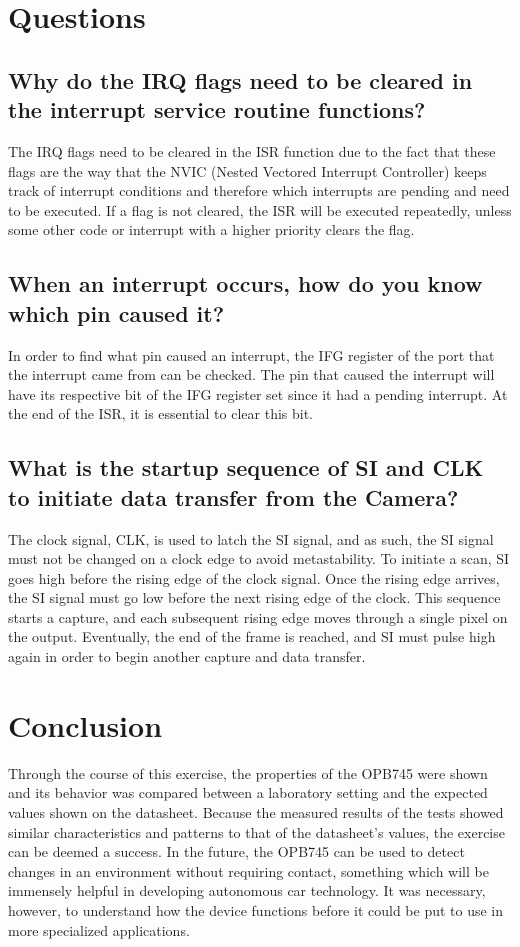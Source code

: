 \documentclass[conference]{IEEEtran}
\begin{document}
\section{Questions}

\subsection{Why do the IRQ flags need to be cleared in the interrupt service
routine functions?}

The IRQ flags need to be cleared in the ISR function due to the fact that
these flags are the way that the NVIC (Nested Vectored Interrupt Controller)
keeps track of interrupt conditions and therefore which interrupts are pending and need to be executed. If
a flag is not cleared, the ISR will be executed repeatedly, unless some other
code or interrupt with a higher priority clears the flag.

\subsection{When an interrupt occurs, how do you know which pin caused it?}

In order to find what pin caused an interrupt, the IFG register of the port
that the interrupt came from can be checked. The pin that caused the
interrupt will have its respective bit of the IFG register set since it had
a pending interrupt. At the end of the ISR, it is essential to clear this
bit.

\subsection{What is the startup sequence of SI and CLK to initiate data 
transfer from the Camera?}

The clock signal, CLK, is used to latch the SI signal, and as such, the SI
signal must not be changed on a clock edge to avoid metastability. To
initiate a scan, SI goes high before the rising edge of the clock signal.
Once the rising edge arrives, the SI signal must go low before the next
rising edge of the clock. This sequence starts a capture, and each subsequent
rising edge moves through a single pixel on the output. Eventually, the end
of the frame is reached, and SI must pulse high again in order to begin
another capture and data transfer.

\section{Conclusion}
Through the course of this exercise, the properties of the OPB745 were shown and its behavior was compared between a laboratory
setting and the expected values shown on the datasheet. Because the measured results of the tests showed similar characteristics and
patterns to that of the datasheet's values, the exercise can be deemed a success. In the future, the OPB745 can be used to detect changes
in an environment without requiring contact, something which will be immensely helpful in developing autonomous car technology. It was
necessary, however, to understand how the device functions before it could be put to use in more specialized applications.
\end{document}
